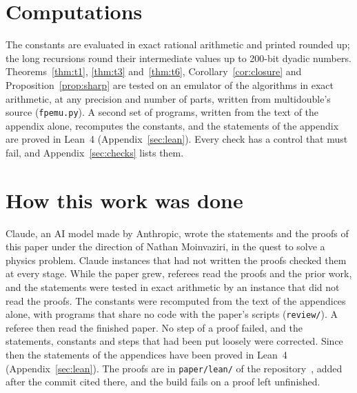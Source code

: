 \documentclass[conference]{IEEEtran}
\theoremstyle{definition}
\theoremstyle{remark}
\begin{document}
\section{Computations}\label{sec:comp}

The constants are evaluated in exact rational arithmetic and printed rounded up; the long recursions round their
intermediate values up to 200-bit dyadic numbers. Theorems~\ref{thm:t1}, \ref{thm:t3} and~\ref{thm:t6},
Corollary~\ref{cor:closure} and Proposition~\ref{prop:sharp} are tested on an emulator of the algorithms in exact
arithmetic, at any precision and number of parts, written from multidouble's source (\texttt{fpemu.py}). A second set
of programs, written from the text of the appendix alone, recomputes the constants, and the statements of the appendix
are proved in Lean~4 (Appendix~\ref{sec:lean}). Every check has a control that must fail, and
Appendix~\ref{sec:checks} lists them.

\section*{How this work was done}

Claude, an AI model made by Anthropic, wrote the statements and the proofs of this paper under the direction of
Nathan Moinvaziri, in the quest to solve a physics problem. Claude instances that had not written the proofs checked
them at every stage. While the paper grew, referees read the proofs and the prior work, and the statements were tested
in exact arithmetic by an instance that did not read the proofs. The constants were recomputed from the text of the
appendices alone, with programs that share no code with the paper's scripts (\texttt{review/}). A referee then read
the finished paper. No step of a proof failed, and the statements, constants and steps that had been put loosely were
corrected. Since then the statements of the appendices have been proved in Lean~4
(Appendix~\ref{sec:lean}). The proofs are in \texttt{paper/lean/} of the repository~\cite{md}, added after the commit
cited there, and the build fails on a proof left unfinished.

\clearpage
{}
\appendices








\end{document}
